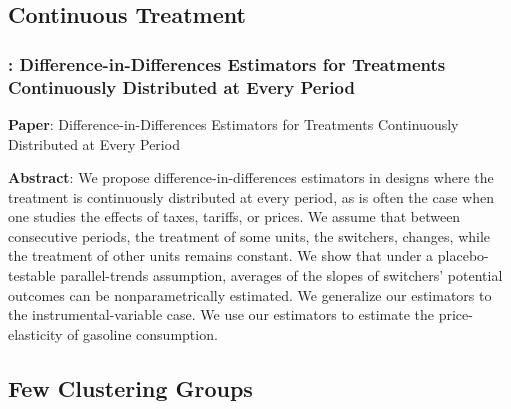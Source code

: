 \documentclass[12pt]{article}
\newcommand{\CiteReference}{../Notes/reference.bib}
\theoremstyle{definition}
\begin{document}
\subsection{Continuous Treatment}

\subsubsection{\citet{dechaisemartinDifferenceinDifferencesEstimatorsTreatments2024}: Difference-in-Differences Estimators for Treatments Continuously Distributed at Every Period}

{\bf Paper}: Difference-in-Differences Estimators for Treatments Continuously Distributed at Every Period

{\bf Abstract}: We propose difference-in-differences estimators in designs where the treatment is continuously distributed at every period, as is often the case when one studies the effects of taxes,  tariffs, or prices. We assume that between consecutive periods, the treatment of some units,  the switchers, changes, while the treatment of other units remains constant. We show that  under a placebo-testable parallel-trends assumption, averages of the slopes of switchers' potential outcomes can be nonparametrically estimated. We generalize our estimators to  the instrumental-variable case. We use our estimators to estimate the price-elasticity of  gasoline consumption.


\subsection{Few Clustering Groups}




\end{document}
